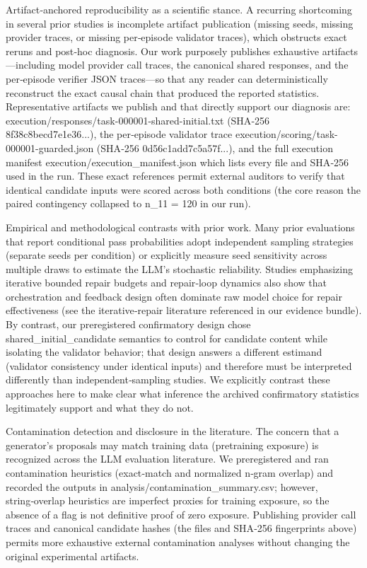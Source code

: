 \documentclass[conference]{IEEEtran}
\begin{document}
Artifact‑anchored reproducibility as a scientific stance. A recurring shortcoming in several prior studies is incomplete artifact publication (missing seeds, missing provider traces, or missing per‑episode validator traces), which obstructs exact reruns and post‑hoc diagnosis. Our work purposely publishes exhaustive artifacts---including model provider call traces, the canonical shared responses, and the per‑episode verifier JSON traces---so that any reader can deterministically reconstruct the exact causal chain that produced the reported statistics. Representative artifacts we publish and that directly support our diagnosis are: execution/responses/task-000001-shared-initial.txt (SHA‑256 8f38c8becd7e1e36...), the per‑episode validator trace execution/scoring/task-000001-guarded.json (SHA‑256 0d56c1add7c5a57f...), and the full execution manifest execution/execution\_manifest.json which lists every file and SHA‑256 used in the run. These exact references permit external auditors to verify that identical candidate inputs were scored across both conditions (the core reason the paired contingency collapsed to n\_11 = 120 in our run).

Empirical and methodological contrasts with prior work. Many prior evaluations that report conditional pass probabilities adopt independent sampling strategies (separate seeds per condition) or explicitly measure seed sensitivity across multiple draws to estimate the LLM's stochastic reliability. Studies emphasizing iterative bounded repair budgets and repair‑loop dynamics also show that orchestration and feedback design often dominate raw model choice for repair effectiveness (see the iterative‑repair literature referenced in our evidence bundle). By contrast, our preregistered confirmatory design chose shared\_initial\_candidate semantics to control for candidate content while isolating the validator behavior; that design answers a different estimand (validator consistency under identical inputs) and therefore must be interpreted differently than independent‑sampling studies. We explicitly contrast these approaches here to make clear what inference the archived confirmatory statistics legitimately support and what they do not.

Contamination detection and disclosure in the literature. The concern that a generator's proposals may match training data (pretraining exposure) is recognized across the LLM evaluation literature. We preregistered and ran contamination heuristics (exact‑match and normalized n‑gram overlap) and recorded the outputs in analysis/contamination\_summary.csv; however, string‑overlap heuristics are imperfect proxies for training exposure, so the absence of a flag is not definitive proof of zero exposure. Publishing provider call traces and canonical candidate hashes (the files and SHA‑256 fingerprints above) permits more exhaustive external contamination analyses without changing the original experimental artifacts.
\end{document}
